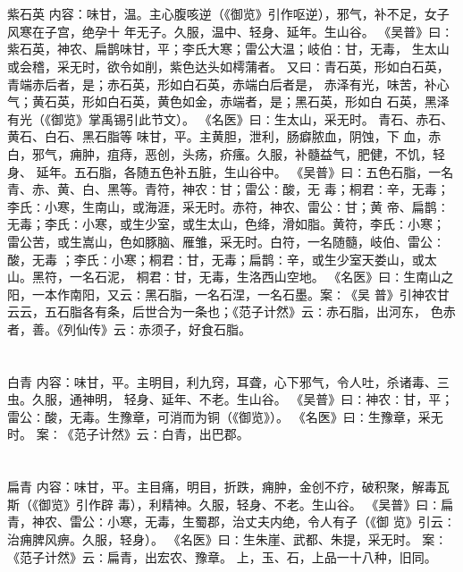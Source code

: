 \documentclass[12pt,UTF8]{ctexbook}
\begin{document}
\chapter{}紫石英
内容：味甘，温。主心腹咳逆（《御览》引作呕逆），邪气，补不足，女子风寒在子宫，绝孕十 
年无子。久服，温中、轻身、延年。生山谷。 
《吴普》曰∶紫石英，神农、扁鹊味甘，平；李氏大寒；雷公大温；岐伯∶甘，无毒， 
生太山或会稽，采无时，欲令如削，紫色达头如樗蒲者。 
又曰∶青石英，形如白石英，青端赤后者，是；赤石英，形如白石英，赤端白后者是， 
赤泽有光，味苦，补心气；黄石英，形如白石英，黄色如金，赤端者，是；黑石英，形如白 
石英，黑泽有光（《御览》掌禹锡引此节文）。 
《名医》曰∶生太山，采无时。 
青石、赤石、黄石、白石、黑石脂等 味甘，平。主黄胆，泄利，肠癖脓血，阴蚀，下 
血，赤白，邪气，痈肿，疽痔，恶创，头疡，疥瘙。久服，补髓益气，肥健，不饥，轻身、 
延年。五石脂，各随五色补五脏，生山谷中。 
《吴普》曰∶五色石脂，一名青、赤、黄、白、黑等。青符，神农∶甘；雷公∶酸，无 
毒；桐君∶辛，无毒；李氏∶小寒，生南山，或海涯，采无时。赤符，神农、雷公∶甘；黄 
帝、扁鹊∶无毒；李氏∶小寒，或生少室，或生太山，色绛，滑如脂。黄符，李氏∶小寒； 
雷公苦，或生嵩山，色如豚脑、雁雏，采无时。白符，一名随髓，岐伯、雷公∶酸，无毒 
；李氏∶小寒；桐君∶甘，无毒；扁鹊∶辛，或生少室天娄山，或太山。黑符，一名石泥， 
桐君∶甘，无毒，生洛西山空地。 
《名医》曰∶生南山之阳，一本作南阳，又云∶黑石脂，一名石涅，一名石墨。案∶《吴 
普》引神农甘云云，五石脂各有条，后世合为一条也；《范子计然》云∶赤石脂，出河东， 
色赤者，善。《列仙传》云∶赤须子，好食石脂。 


\chapter{}白青
内容：味甘，平。主明目，利九窍，耳聋，心下邪气，令人吐，杀诸毒、三虫。久服，通神明， 
轻身、延年、不老。生山谷。 
《吴普》曰∶神农∶甘，平；雷公∶酸，无毒。生豫章，可消而为铜（《御览》）。 
《名医》曰∶生豫章，采无时。 
案∶《范子计然》云∶白青，出巴郡。 


\chapter{}扁青
内容：味甘，平。主目痛，明目，折跌，痈肿，金创不疗，破积聚，解毒瓦斯（《御览》引作辟 
毒），利精神。久服，轻身、不老。生山谷。 
《吴普》曰∶扁青，神农、雷公∶小寒，无毒，生蜀郡，治丈夫内绝，令人有子（《御 
览》引云∶治痈脾风痹。久服，轻身）。 
《名医》曰∶生朱崖、武都、朱提，采无时。 
案∶《范子计然》云∶扁青，出宏农、豫章。 
上，玉、石，上品一十八种，旧同。 
\end{document}
